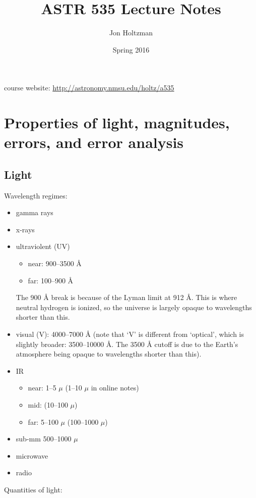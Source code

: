 \documentclass[12pt]{article}
\title{ASTR 535 Lecture Notes}
\author{Jon Holtzman}
\date{Spring 2016}
\begin{document}
\maketitle

\noindent course website: \textcolor{blue}{\url{http://astronomy.nmsu.edu/holtz/a535}}

\section*{Properties of light, magnitudes, errors, and error analysis}

\subsection*{Light}
Wavelength regimes:
\begin{itemize}
    \item gamma rays
    \item x-rays
    \item ultraviolent (UV)
        \begin{itemize}
            \item near: 900--3500 \AA{}
            \item far: 100--900 \AA{}
        \end{itemize}
        The 900 \AA{} break is because of the Lyman limit at 912 \AA{}.
        This is where neutral hydrogen is ionized, so the universe is largely
        opaque to wavelengths shorter than this.
    \item visual (V): 4000--7000 \AA{} (note that `V' is different from `optical',
        which is slightly broader: 3500--10000 \AA{}. The 3500 \AA{} cutoff
        is due to the Earth's atmosphere being opaque to wavelengths shorter
        than this).
    \item IR
        \begin{itemize}
            \item near: 1--5 $\mu$ (1--10 $\mu$ in online notes)
            \item mid: (10--100 $\mu$)
            \item far: 5--100 $\mu$ (100--1000 $\mu$)
        \end{itemize}
    \item sub-mm 500--1000 $\mu$
    \item microwave
    \item radio
\end{itemize}
Quantities of light:
\end{document}
